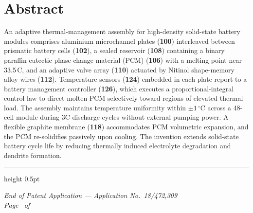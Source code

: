 \section{Abstract}

An adaptive thermal-management assembly for high-density solid-state battery modules
comprises aluminium microchannel plates (\textbf{100}) interleaved between prismatic
battery cells (\textbf{102}), a sealed reservoir (\textbf{108}) containing a binary paraffin
eutectic phase-change material (PCM) (\textbf{106}) with a melting point near
33.5\,\textdegree C, and an adaptive valve array (\textbf{110}) actuated by Nitinol
shape-memory alloy wires (\textbf{112}). Temperature sensors (\textbf{124}) embedded in each
plate report to a battery management controller (\textbf{126}), which executes a
proportional-integral control law to direct molten PCM selectively toward regions of
elevated thermal load. The assembly maintains temperature uniformity within
$\pm 1\,^{\circ}$C across a 48-cell module during 3C discharge cycles without external
pumping power. A flexible graphite membrane (\textbf{118}) accommodates PCM volumetric
expansion, and the PCM re-solidifies passively upon cooling. The invention extends
solid-state battery cycle life by reducing thermally induced electrolyte degradation and
dendrite formation.

\vspace{20pt}
{\color{colrule}\hrule height 0.5pt}
\vspace{6pt}
{\centering\small\color{muted}
  \textit{End of Patent Application --- Application No.~18/472,309}\\[2pt]
  \textit{Page \thepage\ of \pageref{LastPage}}
\par}
